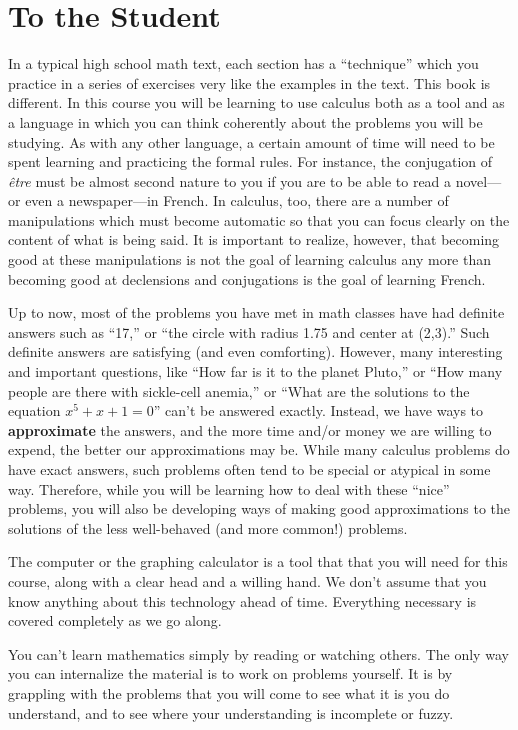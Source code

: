 \section*{To the Student}

In a typical high school math text, each section has a ``technique'' which you practice in a series of exercises very like the examples in the text.  This book is different.  In this course you will be learning to use calculus both as a tool and as a language in which you can think coherently about the problems you will be studying.  As with any other language, a certain amount of time will need to be spent learning and practicing the formal rules.  For instance, the conjugation of {\em \^etre\/} must be almost second nature to you if you are to be able to read a novel---or even a newspaper---in French.  In calculus, too, there are a number of manipulations which must become automatic so that you can focus clearly on the content of what is being said.  It is important to realize, however, that becoming good at these manipulations is not the goal of learning calculus any more than becoming good at declensions and conjugations is the goal of learning French.

Up to now, most of the problems you have met in math classes have had definite answers such as ``17,'' or ``the circle with radius 1.75 and center at (2,3).''  Such definite answers are satisfying (and even comforting).  However, many interesting and important questions, like ``How far is it to the planet Pluto,'' or ``How many people are there with sickle-cell anemia,'' or ``What are the solutions to the equation $x^5 + x + 1 = 0$'' can't be answered exactly.  Instead, we have ways to {\bf approximate} the answers, and the more time and/or money we are willing to expend, the better our approximations may be.  While many calculus problems do have exact answers, such problems often tend to be special or atypical in some way.  Therefore, while you will be learning how to deal with these ``nice'' problems, you will also be developing ways of making good approximations to the solutions of the less well-behaved (and more common!) problems.

The computer or the graphing calculator is a tool that that you will need for this course, along with a clear head and a willing hand.  We don't assume that you know anything about this technology ahead of time.  Everything necessary is covered completely as we go along.

You can't learn mathematics simply by reading or watching others.  The only way you can internalize the material is to work on problems yourself.  It is by grappling with the problems that you will come to see what it is you do understand, and to see where your understanding is incomplete or fuzzy.

